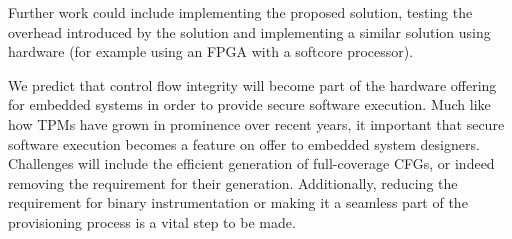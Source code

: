 Further work could include implementing the proposed solution, testing the overhead introduced by the solution and implementing a similar solution using hardware (for example using an FPGA with a softcore processor).

We predict that control flow integrity will become part of the hardware offering for embedded systems in order to provide secure software execution. Much like how TPMs have grown in prominence over recent years, it important that secure software execution becomes a feature on offer to embedded system designers. Challenges will include the efficient generation of full-coverage CFGs, or indeed removing the requirement for their generation. Additionally, reducing the requirement for binary instrumentation or making it a seamless part of the provisioning process is a vital step to be made.

